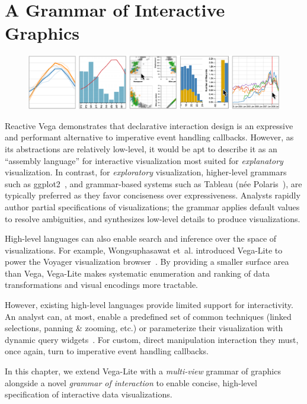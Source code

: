 \graphicspath{{./vega-lite/figures/}}
\chapter{A Grammar of Interactive Graphics}
\label{sec:vega-lite}

\begin{figure}[h!]
  \vspace{-30pt}
  \centering
  \includegraphics[width=\columnwidth]{teaser}
\end{figure}


Reactive Vega demonstrates that declarative interaction design is an expressive
and performant alternative to imperative event handling callbacks. However, as
its abstractions are relatively low-level, it would be apt to describe it as an
``assembly language'' for interactive visualization most suited for
\emph{explanatory} visualization. In contrast, for \emph{exploratory}
visualization, higher-level grammars such as ggplot2~\cite{wickham:layered}, and
grammar-based systems such as Tableau (n\'ee Polaris~\cite{stolte:polaris}), are
typically preferred as they favor conciseness over expressiveness. Analysts
rapidly author partial specifications of visualizations; the grammar applies
default values to resolve ambiguities, and synthesizes low-level details to
produce visualizations.

High-level languages can also enable search and inference over the space of
visualizations. For example, Wongsuphasawat et~al. introduced Vega-Lite to power
the Voyager visualization browser~\cite{voyager}. By providing a smaller surface
area than Vega, Vega-Lite makes systematic enumeration and ranking of data
transformations and visual encodings more tractable.

However, existing high-level languages provide limited support for
interactivity. An analyst can, at most, enable a predefined set of common
techniques (linked selections, panning \& zooming, etc.) or parameterize their
visualization with dynamic query widgets~\cite{shiny}. For custom,
direct manipulation interaction they must, once again, turn to imperative event
handling callbacks.

In this chapter, we extend Vega-Lite with a \emph{multi-view} grammar of
graphics alongside a novel \emph{grammar of interaction} to enable concise,
high-level specification of interactive data visualizations.





